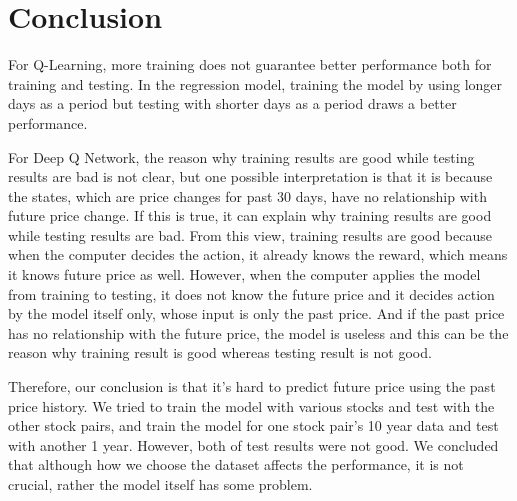 \chapter{Conclusion}
\label{Ch:conclusion}

For Q-Learning, more training does not guarantee better performance both for training and testing. In the regression model, training the model by using longer days as a period but testing with shorter days as a period draws a better performance. 

For Deep Q Network, the reason why training results are good while testing results are bad is not clear, but one possible interpretation is that it is because the states, which are price changes for past 30 days, have no relationship with future price change. If this is true, it can explain why training results are good while testing results are bad. From this view, training results are good because when the computer decides the action, it already knows the reward, which means it knows future price as well. However, when the computer applies the model from training to testing, it does not know the future price and it decides action by the model itself only, whose input is only the past price. And if the past price has no relationship with the future price, the model is useless and this can be the reason why training result is good whereas testing result is not good. 

Therefore, our conclusion is that it’s hard to predict future price using the past price history. We tried to train the model with various stocks and test with the other stock pairs, and train the model for one stock pair’s 10 year data and test with another 1 year. However, both of test results were not good. We concluded that although how we choose the dataset affects the performance, it is not crucial, rather the model itself has some problem. 

